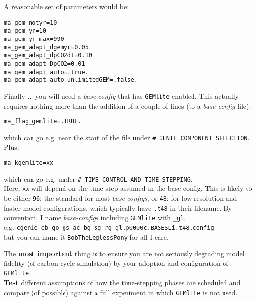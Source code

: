 \begin{enumerate}
A reasonable set of parameters would be:
\vspace{-1mm}\small\begin{verbatim}
ma_gem_notyr=10
ma_gem_yr=10
ma_gem_yr_max=990
ma_gem_adapt_dgemyr=0.05
ma_gem_adapt_dpCO2dt=0.10
ma_gem_adapt_DpCO2=0.01
ma_gem_adapt_auto=.true.
ma_gem_adapt_auto_unlimitedGEM=.false.
\end{verbatim}\normalsize\vspace{-1mm}

\end{enumerate}
\vspace{2mm}

\noindent Finally ... you will need a \textit{base-config} that has \texttt{GEMlite} enabled.
This actually requires nothing more than the addition of a couple of lines (to a \textit{base-config} file):
\vspace{-1mm}\begin{verbatim}
ma_flag_gemlite=.TRUE.
\end{verbatim}\vspace{-1mm}
which can go e.g. near the start of the file under \texttt{\# GENIE COMPONENT SELECTION}.
Plus:
\vspace{-1mm}\begin{verbatim}
ma_kgemlite=xx
\end{verbatim}\vspace{-1mm}
which can go e.g. under \texttt{\# TIME CONTROL AND TIME-STEPPING}.
\\Here, \texttt{xx} will depend on the time-step assumed in the base-config. This is likely to be either \texttt{96}: the standard for most \textit{base-configs}, or \texttt{48}: for low resolution and faster model configurations, which typically have \texttt{.t48} in their filename.
By convention, I name \textit{base-configs} including \texttt{GEMlite} with \texttt{\_gl},
\\e.g. \texttt{cgenie\_eb\_go\_gs\_ac\_bg\_sg\_rg\_gl.p0000c.BASESLi.t48.config}
\\but you can name it \texttt{BobTheLeglessPony} for all I care.

The \textbf{most important} thing is to ensure you are not seriously degrading model fidelity (of carbon cycle simulation) by your adoption and configuration of \texttt{GEMlite}.
\\\textbf{Test} different assumptions of how the time-stepping phases are scheduled and compare (of possible) against a full experiment in which \texttt{GEMlite} is not used.

